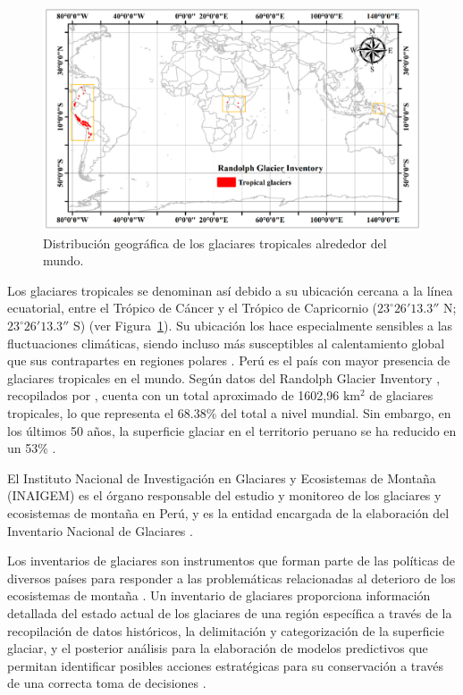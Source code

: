 \begin{figure}[H]
    \begin{center}
        \includegraphics[width=1\textwidth]{Images/GlaciaresTropicales.png}
    \end{center}
    \caption{Distribución geográfica de los glaciares tropicales alrededor del mundo.}
    \label{fig:GlaciaresTropicales}
\end{figure}

Los glaciares tropicales se denominan así debido a su ubicación cercana a la línea ecuatorial, entre el Trópico de Cáncer y el Trópico de Capricornio ($23^\circ 26'13.3'' \text{ N}$; $23^\circ 26'13.3'' \text{ S}$) (ver Figura~\ref{fig:GlaciaresTropicales}). Su ubicación los hace especialmente sensibles a las fluctuaciones climáticas, siendo incluso más susceptibles al calentamiento global que sus contrapartes en regiones polares \cite{dussaillant2019two}. Perú es el país con mayor presencia de glaciares tropicales en el mundo. Según datos del Randolph Glacier Inventory \cite{pfeffer2014randolph}, recopilados por \cite{veettil2019global}, cuenta con un total aproximado de 1602,96 km$^2$ de glaciares tropicales, lo que representa el 68.38\% del total a nivel mundial. Sin embargo, en los últimos 50 años, la superficie glaciar en el territorio peruano se ha reducido en un 53\% \cite{reserva2021}.

El Instituto Nacional de Investigación en Glaciares y Ecosistemas de Montaña (INAIGEM) es el órgano responsable del estudio y monitoreo de los glaciares y ecosistemas de montaña en Perú, y es la entidad encargada de la elaboración del Inventario Nacional de Glaciares \cite{inaigem2018inventario}.

Los inventarios de glaciares son instrumentos que forman parte de las políticas de diversos países para responder a las problemáticas relacionadas al deterioro de los ecosistemas de montaña \cite{barella2022combined}. Un inventario de glaciares proporciona información detallada del estado actual de los glaciares de una región específica a través de la recopilación de datos históricos, la delimitación y categorización de la superficie glaciar, y el posterior análisis para la elaboración de modelos predictivos que permitan identificar posibles acciones estratégicas para su conservación a través de una correcta toma de decisiones \cite{barcaza2017glacier}.

